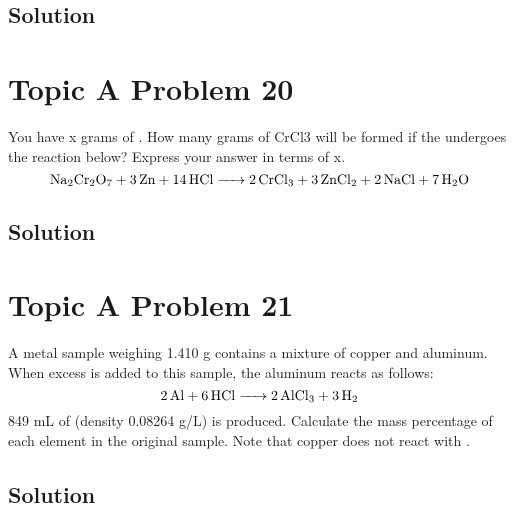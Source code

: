 \documentclass[10pt]{article}
\begin{document}
        \subsection{Solution}

    \pagebreak
    \section{Topic A Problem 20}
        You have x grams of . 
        How many grams of CrCl3 will be formed if the  undergoes the reaction below? 
        Express your answer in terms of x.
        \begin{equation}
            \ce{Na2Cr2O7 + 3 Zn + 14 HCl -> 2 CrCl3 + 3 ZnCl2 + 2 NaCl + 7 H2O}
        \end{equation}

        \subsection{Solution}

    \pagebreak
    \section{Topic A Problem 21}
        A metal sample weighing 1.410 g contains a mixture of copper and aluminum. 
        When excess  is added to this sample, the aluminum reacts as follows:
        \begin{equation}
            \ce{2 Al + 6 HCl -> 2 AlCl3 + 3 H2}
        \end{equation}
        849 mL of  (density 0.08264 g/L) is produced. 
        Calculate the mass percentage of each element in the original sample. 
        Note that copper does not react with .

        \subsection{Solution}

\end{document}
